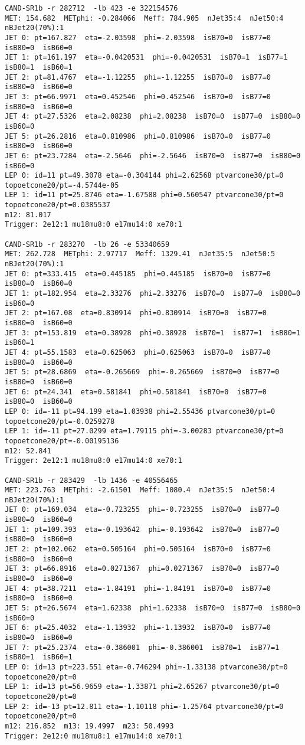 \begin{footnotesize}
\begin{verbatim}
CAND-SR1b -r 282712  -lb 423 -e 322154576 
MET: 154.682  METphi: -0.284066  Meff: 784.905  nJet35:4  nJet50:4  nBJet20(70%):1  
JET 0: pt=167.827  eta=-2.03598  phi=-2.03598  isB70=0  isB77=0  isB80=0  isB60=0
JET 1: pt=161.197  eta=-0.0420531  phi=-0.0420531  isB70=1  isB77=1  isB80=1  isB60=1
JET 2: pt=81.4767  eta=-1.12255  phi=-1.12255  isB70=0  isB77=0  isB80=0  isB60=0
JET 3: pt=66.9971  eta=0.452546  phi=0.452546  isB70=0  isB77=0  isB80=0  isB60=0
JET 4: pt=27.5326  eta=2.08238  phi=2.08238  isB70=0  isB77=0  isB80=0  isB60=0
JET 5: pt=26.2816  eta=0.810986  phi=0.810986  isB70=0  isB77=0  isB80=0  isB60=0
JET 6: pt=23.7284  eta=-2.5646  phi=-2.5646  isB70=0  isB77=0  isB80=0  isB60=0
LEP 0: id=11 pt=49.3078 eta=-0.304144 phi=2.62568 ptvarcone30/pt=0 topoetcone20/pt=-4.5744e-05
LEP 1: id=11 pt=25.8746 eta=-1.67588 phi=0.560547 ptvarcone30/pt=0 topoetcone20/pt=0.0385537
m12: 81.017
Trigger: 2e12:1 mu18mu8:0 e17mu14:0 xe70:1

CAND-SR1b -r 283270  -lb 26 -e 53340659 
MET: 262.728  METphi: 2.97717  Meff: 1329.41  nJet35:5  nJet50:5  nBJet20(70%):1  
JET 0: pt=333.415  eta=0.445185  phi=0.445185  isB70=0  isB77=0  isB80=0  isB60=0
JET 1: pt=182.954  eta=2.33276  phi=2.33276  isB70=0  isB77=0  isB80=0  isB60=0
JET 2: pt=167.08  eta=0.830914  phi=0.830914  isB70=0  isB77=0  isB80=0  isB60=0
JET 3: pt=153.819  eta=0.38928  phi=0.38928  isB70=1  isB77=1  isB80=1  isB60=1
JET 4: pt=55.1583  eta=0.625063  phi=0.625063  isB70=0  isB77=0  isB80=0  isB60=0
JET 5: pt=28.6869  eta=-0.265669  phi=-0.265669  isB70=0  isB77=0  isB80=0  isB60=0
JET 6: pt=24.341  eta=0.581841  phi=0.581841  isB70=0  isB77=0  isB80=0  isB60=0
LEP 0: id=-11 pt=94.199 eta=1.03938 phi=2.55436 ptvarcone30/pt=0 topoetcone20/pt=-0.0259278
LEP 1: id=-11 pt=27.0299 eta=1.79115 phi=-3.00283 ptvarcone30/pt=0 topoetcone20/pt=-0.00195136
m12: 52.841
Trigger: 2e12:1 mu18mu8:0 e17mu14:0 xe70:1

CAND-SR1b -r 283429  -lb 1436 -e 40556465 
MET: 223.763  METphi: -2.61501  Meff: 1080.4  nJet35:5  nJet50:4  nBJet20(70%):1  
JET 0: pt=169.034  eta=-0.723255  phi=-0.723255  isB70=0  isB77=0  isB80=0  isB60=0
JET 1: pt=109.393  eta=-0.193642  phi=-0.193642  isB70=0  isB77=0  isB80=0  isB60=0
JET 2: pt=102.062  eta=0.505164  phi=0.505164  isB70=0  isB77=0  isB80=0  isB60=0
JET 3: pt=66.8916  eta=0.0271367  phi=0.0271367  isB70=0  isB77=0  isB80=0  isB60=0
JET 4: pt=38.7211  eta=-1.84191  phi=-1.84191  isB70=0  isB77=0  isB80=0  isB60=0
JET 5: pt=26.5674  eta=1.62338  phi=1.62338  isB70=0  isB77=0  isB80=0  isB60=0
JET 6: pt=25.4032  eta=-1.13932  phi=-1.13932  isB70=0  isB77=0  isB80=0  isB60=0
JET 7: pt=25.2374  eta=-0.386001  phi=-0.386001  isB70=1  isB77=1  isB80=1  isB60=1
LEP 0: id=13 pt=223.551 eta=-0.746294 phi=-1.33138 ptvarcone30/pt=0 topoetcone20/pt=0
LEP 1: id=13 pt=56.9659 eta=-1.33871 phi=2.65267 ptvarcone30/pt=0 topoetcone20/pt=0
LEP 2: id=-13 pt=12.811 eta=-1.10118 phi=-1.25764 ptvarcone30/pt=0 topoetcone20/pt=0
m12: 216.852  m13: 19.4997  m23: 50.4993
Trigger: 2e12:0 mu18mu8:1 e17mu14:0 xe70:1

\end{verbatim}
\end{footnotesize}